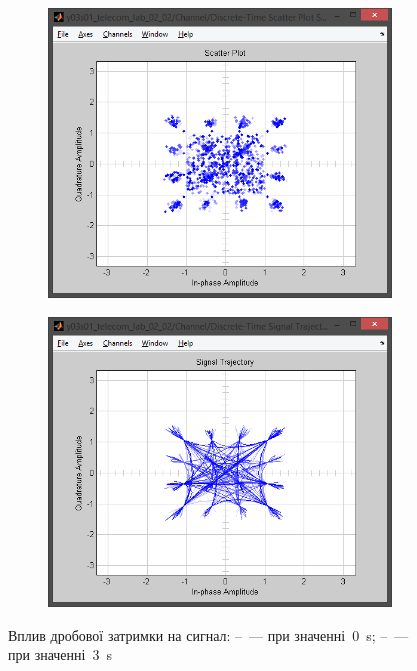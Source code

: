 \documentclass[
	a4paper,
	oneside,
	BCOR = 10mm,
	DIV = 12,
	12pt,
	headings = normal,
]{scrartcl}
\begin{document}
\begin{figure}[!htbp]
\begin{subfigure}{\textwidth / 3}
						\caption{}
						\label{subfig:fracdelay-eye-out}
					\end{subfigure}%
					\begin{subfigure}{\textwidth / 3}
						\centering
						\includegraphics[height = 7\baselineskip]{../01-solution/03-fracdelay-3p0-channel-scatter-plot.png}
						\caption{}
						\label{subfig:fracdelay-signal-trajectory-out}
					\end{subfigure}%
					\begin{subfigure}{\textwidth / 3}
						\centering
						\includegraphics[height = 7\baselineskip]{../01-solution/03-fracdelay-3p0-channel-signal-trajectory.png}
						\caption{}
						\label{subfig:fracdelay-scatter-plot-out}
					\end{subfigure}%
					\caption{Вплив дробової затримки на сигнал: –~— при значенні~\SI{0}{\second}; –~— при значенні~\SI{3}{\second}}
					\label{fig:fracdelay-plots}
				\end{figure}
\end{document}
